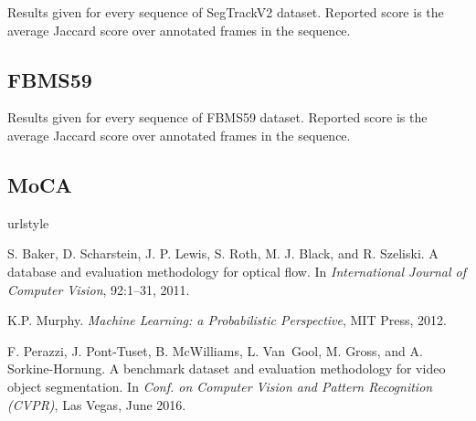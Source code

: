 \documentclass[10pt,twocolumn,letterpaper]{article}
\begin{document}
\begin{table}[H]\centering
{}
\caption{Results given for every sequence of SegTrackV2 dataset. Reported score is the average Jaccard score over annotated frames in the sequence.}
\end{table}

\subsection{FBMS59}

\begin{table}[H]\centering
{}
\caption{Results given for every sequence of FBMS59 dataset. Reported score is the average Jaccard score over annotated frames in the sequence.}
\end{table}

\subsection{MoCA}





\begin{thebibliography}{28}
\providecommand{\natexlab}[1]{#1}
\providecommand{\url}[1]{\texttt{#1}}
\expandafter\ifx\csname urlstyle\endcsname\relax
  \providecommand{\doi}[1]{doi: #1}\else
  \providecommand{\doi}{doi: \begingroup \urlstyle{rm}\Url}\fi

S. Baker, D. Scharstein, J. P. Lewis, S. Roth, M. J. Black, and R. Szeliski.
\newblock A database and evaluation methodology for optical flow.
\newblock In \emph{International Journal of Computer Vision}, 92:1–31, 2011.


K.P. Murphy.
\newblock \emph{Machine Learning: a Probabilistic Perspective},
\newblock MIT Press, 2012.

F. Perazzi, J. Pont-Tuset, B. McWilliams, L. Van~Gool, M. Gross, and A. Sorkine-Hornung.
\newblock A benchmark dataset and evaluation methodology for video object segmentation.
\newblock In \emph{Conf. on Computer Vision and Pattern Recognition (CVPR)}, Las Vegas, June 2016.
\end{thebibliography}
\end{document}
